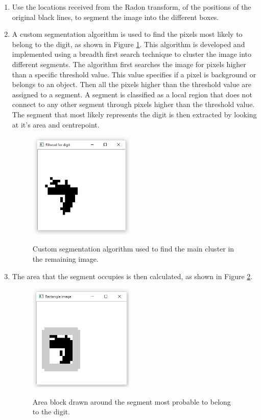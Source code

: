 \begin{enumerate}
\item Use the locations received from the Radon transform, of the positions of the original black lines, to segment the image into the different boxes.
\item A custom segmentation algorithm is used to find the pixels most likely to belong to the digit, as shown in Figure \ref{fig:c}. This algorithm is developed and implemented using a breadth first search technique to cluster the image into different segments. The algorithm first searches the image for pixels higher than a specific threshold value. This value specifies if a pixel is background or belongs to an object. Then all the pixels higher than the threshold value are assigned to a segment. A segment is classified as a local region that does not connect to any other segment through pixels higher than the threshold value. The segment that most likely represents the digit is then extracted by looking at it's area and centrepoint.
\begin{figure}
  \centering
  \includegraphics[width=5cm]{Cluster}\\
  \caption{Custom segmentation algorithm used to find the main cluster in the remaining image.}
  \label{fig:c}
\end{figure}

\item The area that the segment occupies is then calculated, as shown in Figure \ref{fig:areaLoc}.

\begin{figure}
  \centering
  \includegraphics[width=5cm]{DetectArea}\\
  \caption{Area block drawn around the segment most probable to belong to the digit.}
  \label{fig:areaLoc}
\end{figure}


\end{enumerate}
